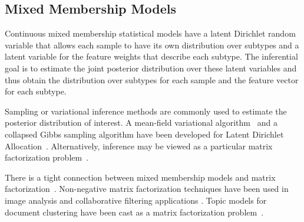 \documentclass{article} %
\begin{document}

\subsection{Mixed Membership Models}

Continuous mixed membership statistical models have a latent Dirichlet random
variable that allows each sample to have its own distribution over subtypes and
a latent variable for the feature weights that describe each subtype. The
inferential goal is to estimate the joint posterior distribution over these
latent variables and thus obtain the distribution over subtypes for each sample
and the feature vector for each subtype.

Sampling or variational inference methods are commonly used to estimate the
posterior distribution of interest. A mean-field variational
algorithm~\cite{Blei2003a} and a collapsed Gibbs sampling algorithm have been
developed for Latent Dirichlet Allocation~\cite{Xiao2010}. Alternatively,
inference may be viewed as a particular matrix factorization
problem~\cite{Mackey2010}.

There is a tight connection between mixed membership models and matrix
factorization~\cite{Singh2008}. Non-negative matrix factorization techniques
have been used in image analysis and collaborative filtering applications
\cite{Lee1999,Mackey2010}. Topic models for document clustering have been cast
as a matrix factorization problem~\cite{Xu2003}.
\end{document}
